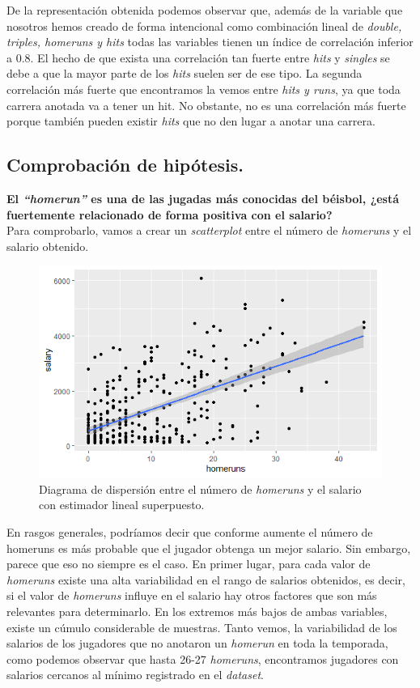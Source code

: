 \documentclass[a4paper,12pt, oneside]{book}
\begin{document}
De la representación obtenida podemos observar que, además de la variable que nosotros hemos creado de forma intencional como combinación lineal de \textit{double, triples, homeruns y hits} todas las variables tienen un índice de correlación inferior a 0.8. El hecho de que exista una correlación tan fuerte entre \textit{hits} y \textit{singles} se debe a que la mayor parte de los \textit{hits} suelen ser de ese tipo. La segunda correlación más fuerte que encontramos la vemos entre \textit{hits y runs}, ya que toda carrera anotada va a tener un hit. No obstante, no es una correlación más fuerte porque también pueden existir \textit{hits} que no den lugar a anotar una carrera.

\subsection{Comprobación de hipótesis.}
\textbf{El \textit{``homerun''} es una de las jugadas más conocidas del béisbol, ¿está fuertemente relacionado de forma positiva con el salario?}\\

Para comprobarlo, vamos a crear un \textit{scatterplot} entre el número de \textit{homeruns} y el salario obtenido.\\

\begin{figure}[H]
\centering
\includegraphics[scale=0.7]{images/homerun_salary.png}
\caption{Diagrama de dispersión entre el número de \textit{homeruns} y el salario con estimador lineal superpuesto.}
\label{homerunsalary}
\end{figure}

En rasgos generales, podríamos decir que conforme aumente el número de homeruns es más probable que el jugador obtenga un mejor salario. Sin embargo, parece que eso no siempre es el caso. En primer lugar, para cada valor de \textit{homeruns} existe una alta variabilidad en el rango de salarios obtenidos, es decir, si el valor de \textit{homeruns} influye en el salario hay otros factores que son más relevantes para determinarlo. En los extremos más bajos de ambas variables, existe un cúmulo considerable de muestras. Tanto vemos, la variabilidad de los salarios de los jugadores que no anotaron un \textit{homerun} en toda la temporada, como podemos observar que hasta 26-27 \textit{homeruns}, encontramos jugadores con salarios cercanos al mínimo registrado en el \textit{dataset}.\\
\end{document}
